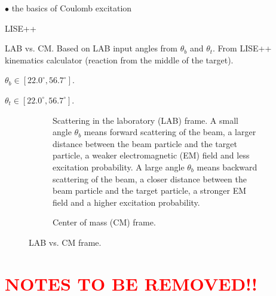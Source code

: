 \documentclass[twoside,english]{uiofysmaster/uiofysmaster}
\begin{document}
$\bullet$ the basics of Coulomb excitation 


\bigskip

LISE++ \cite{LISE}

\begin{table}[ht] 
    \centering 
    \caption{LAB vs. CM. Based on LAB input angles from $\theta_b$ and $\theta_t$. From LISE++ kinematics calculator (reaction from the middle of the target).}
	\label{tab:LABvsCM}
    \begin{subtable}{0.45\textwidth}
    		\centering
		\caption{$\theta_b \in [22.0^\circ, 56.7^\circ]$.}
	 	\label{tab:LABvsCM_b}
	 	
	\end{subtable}
	\begin{subtable}{0.45\textwidth}
		\centering
		\caption{$\theta_t \in [22.0^\circ, 56.7^\circ]$.}
		\label{tab:LABvsCM_t}
		
	\end{subtable}
\end{table}


\begin{figure}
	\centering
	\begin{subfigure}{\textwidth}
		
		\caption{Scattering in the laboratory (LAB) frame. A small angle $\theta_b$ means forward scattering of the beam, a larger distance between the beam particle and the target particle, a weaker electromagnetic (EM) field and less excitation probability. A large angle $\theta_b$ means backward scattering of the beam, a closer distance between the beam particle and the target particle, a stronger EM field and a higher excitation probability.}
		\label{fig:LAB}
	\end{subfigure}
	\begin{subfigure}{\textwidth}
		
		\caption{Center of mass (CM) frame.}
		\label{fig:CM}
	\end{subfigure}
	\caption{LAB vs. CM frame.}
	\label{fig:LAB-CM}
\end{figure}

\newpage

\chapter*{\textcolor{red}{NOTES TO BE REMOVED!!}}
\end{document}
